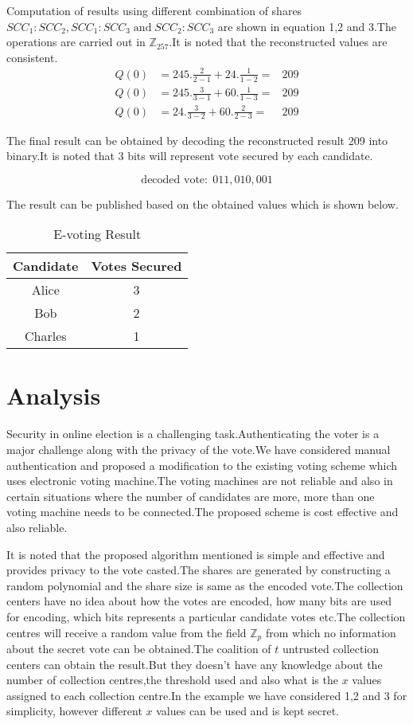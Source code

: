 \documentclass[conference]{IEEEtran}
\begin{document}
Computation of results using different combination of shares $SCC_1:SCC_2,SCC_1:SCC_3 \;\mbox{and}\; SCC_2:SCC_3$ are shown in equation 1,2 and 3.The operations are carried out in $\mathbb{Z}_{257}$.It is noted that the reconstructed values are consistent.
\begin{eqnarray}
Q(0) &=  245.\frac{2}{2-1} + 24. \frac{1}{1-2} =&  209 \\
Q(0) &=  245.\frac{3}{3-1} + 60. \frac{1}{1-3} =&  209 \\
Q(0) &=  24.\frac{3}{3-2} + 60. \frac{2}{2-3}  =&  209 
\end{eqnarray}

The final result can be obtained by decoding the reconstructed result 209 into
binary.It is noted that 3 bits will represent vote secured by each candidate.

$$\mbox{decoded vote}:\; 011, 010, 001$$

The result can be published based on the obtained values which is shown below.

\begin{table}[ht]
	\small
	\caption{E-voting Result}
\centering
	\begin{tabular}{|c|c|} \hline
		 \textbf{Candidate}	& \textbf{Votes Secured} \\
		\hline
		Alice & 3 \\
		\hline
		Bob &   2 \\
		\hline
		Charles & 1 \\
		\hline
	\end{tabular} 
\end{table}

\section{Analysis}

Security in online election is a challenging task.Authenticating the voter is a major challenge along with the privacy of the vote.We have considered manual authentication and proposed a modification to the existing voting scheme which uses electronic voting machine.The voting machines are not reliable and also in certain situations where the number of candidates are more, more than one voting machine needs to be connected.The proposed scheme is cost effective and also reliable.

It is noted that the proposed algorithm mentioned is simple and effective and provides privacy to the vote casted.The shares are generated  by constructing a random polynomial and the share size is same as the encoded vote.The collection centers have no idea about how the votes are encoded, how many bits are used for encoding, which bits represents a particular candidate votes etc.The collection centres will receive a random value from the field $\mathbb{Z}_p$ from which no information about the secret vote can be obtained.The coalition of $t$ untrusted collection centers can obtain the result.But they doesn't have any knowledge about the number of collection centres,the threshold used and also what is the $x$ values assigned to each collection centre.In the example we have considered 1,2 and 3 for simplicity, however different $x$ values can be used and is kept secret.
\end{document}
